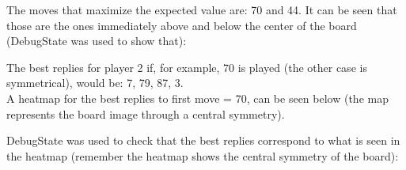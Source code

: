 \documentclass[a4paper,12pt]{article}
\begin{document}
The moves that maximize the expected value are: 70 and 44. It can be seen that those are the ones immediately above and below the center of the board (DebugState was used to show that):

The best replies for player 2 if, for example, 70 is played (the other case is symmetrical), would be: 7, 79, 87, 3.\\
A heatmap for the best replies to first move = 70, can be seen below (the map represents the board image through a central symmetry).

DebugState was used to check that the best replies correspond to what is seen in the heatmap (remember the heatmap shows the central symmetry of the board):
\end{document}

